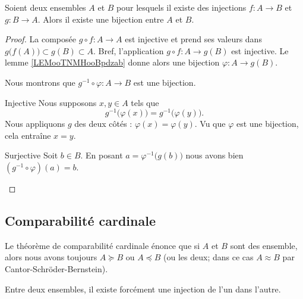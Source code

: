 \begin{theorem}      \label{THOooRYZJooQcjlcl}
    Soient deux ensembles \( A\) et \( B\) pour lesquels il existe des injections \( f\colon A\to B\) et \( g\colon B\to A\). Alors il existe une bijection entre \( A\) et \( B\).
\end{theorem}

\begin{proof}
    La composée \( g\circ f\colon A\to A\) est injective et prend ses valeurs dans \( g\big( f(A) \big)\subset g(B)\subset A\). Bref, l'application \( g\circ f\colon A \to g(B)\) est injective. Le lemme \ref{LEMooTNMHooBpdzab} donne alors une bijection \( \varphi\colon A\to g(B)\).

    Nous montrons que \( g^{-1}\circ\varphi\colon A\to B\) est une bijection.

    \begin{subproof}
        \item[Injective]
            Nous supposons \( x,y\in A\) tels que
            \begin{equation}
                g^{-1}\big( \varphi(x) \big)=g^{-1}\big( \varphi(y) \big).
            \end{equation}
            Nous appliquons \( g\) des deux côtés : \( \varphi(x)=\varphi(y)\). Vu que \( \varphi\) est une bijection, cela entraîne \( x=y\).
        \item[Surjective]
            Soit \( b\in B\). En posant \( a=\varphi^{-1}\big( g(b) \big)\) nous avons bien \( (g^{-1}\circ \varphi)(a)=b\).
    \end{subproof}
\end{proof}

\subsection{Comparabilité cardinale}

Le théorème de comparabilité cardinale énonce que si \( A\) et \( B\) sont des ensemble, alors nous avons toujours \( A\succeq B\) ou \( A\preceq B\) (ou les deux; dans ce cas \( A\approx B\) par Cantor-Schröder-Bernstein).
\begin{theorem}     \label{THOooCBSKooCmzfUf}
    Entre deux ensembles, il existe forcément une injection de l'un dans l'autre.
\end{theorem}

